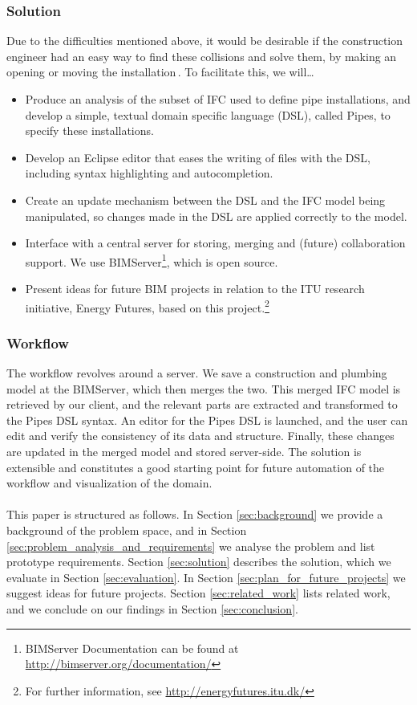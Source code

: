 \subsubsection{Solution}
Due to the difficulties mentioned above, it would be desirable if the construction engineer had an easy way to find these collisions and solve them, by making an opening or moving the installation\,\cite{jorgensen12}. To facilitate this, we will…
\begin{itemize}
\item Produce an analysis of the subset of IFC used to define pipe installations, and develop a simple, textual domain specific language (DSL), called Pipes, to specify these installations.
\item Develop an Eclipse editor that eases the writing of files with the DSL, including syntax highlighting and autocompletion.
\item Create an update mechanism between the DSL and the IFC model being manipulated, so changes made in the DSL are applied correctly to the model.
\item Interface with a central server for storing, merging and (future) collaboration support. We use BIMServer\footnote{BIMServer Documentation can be found at \url{http://bimserver.org/documentation/}}, which is open source.
\item Present ideas for future BIM projects in relation to the ITU research initiative, Energy Futures, based on this project.\footnote{For further information, see \url{http://energyfutures.itu.dk/}}
\end{itemize}

\subsubsection{Workflow}
\label{sec:workflow}
The workflow revolves around a server. We save a construction and plumbing model at the BIMServer, which then merges the two. This merged IFC model is retrieved by our client, and the relevant parts are extracted and transformed to the Pipes DSL syntax. An editor for the Pipes DSL is launched, and the user can edit and verify the consistency of its data and structure. Finally, these changes are updated in the merged model and stored server-side. The solution is extensible and constitutes a good starting point for future automation of the workflow and visualization of the domain.

\paragraph{}
This paper is structured as follows. In Section \ref{sec:background} we provide a background of the problem space, and in Section \ref{sec:problem_analysis_and_requirements} we analyse the problem and list prototype requirements. Section \ref{sec:solution} describes the solution, which we evaluate in Section \ref{sec:evaluation}. In Section \ref{sec:plan_for_future_projects} we suggest ideas for future projects. Section \ref{sec:related_work} lists related work, and we conclude on our findings in Section \ref{sec:conclusion}.
